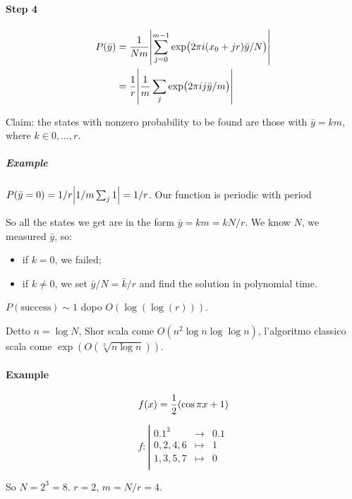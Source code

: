\paragraph{Step 4}

\begin{align}
  P(\bar{y})
  &= \frac{1}{Nm} \abs{\sum _{j=0} ^{m-1} \exp(2 \pi i (x_0 + jr) \bar{y}/N) }  \\
  &= \frac{1}{r} \abs{\frac{1}{m} \sum_j \exp(2 \pi i j \bar{y} /m)}
\end{align}

Claim: the states with nonzero probability to be found are those with \( \bar{y} = km \), where \( k \in 0, \dots,  r \).

\subparagraph{Example}

\( P(\bar{y} = 0) = 1/r \abs{1/m \sum_j 1} = 1/r \). Our function is periodic with period

So all the states we get are in the form \( \bar{y}=km = kN/r \). We know $N$, we measured \( \bar{y} \), so:

\begin{itemize}
  \item if \( k=0 \), we failed;
  \item if \( k\neq 0 \), we set \( \bar{y}/N = \bar{k}/r \) and find the solution in polynomial time.
\end{itemize}

\( P(\text{success}) \sim 1 \) dopo \( O(\log(\log(r))) \).

Detto \( n = \log N \), Shor scala come \( O(n^2 \log n \log \log n) \), l'algoritmo classico scala come \( \exp(O(\sqrt[3]{n\log n})) \).

\paragraph{Example}

\begin{equation}
  f(x) = \frac{1}{2} \qty(\cos \pi x + 1)
\end{equation}

\[
 f:
\left|
  \begin{array}{rcl}
    \qty{0,1}^3 & \longrightarrow & \qty{0,1} \\
    0,2,4,6 & \longmapsto & 1 \\
    1,3,5,7 & \longmapsto & 0 \\
  \end{array}
\right.
\]

So \( N = 2^3 = 8 \). \( r=2 \), \( m = N/r = 4 \).

